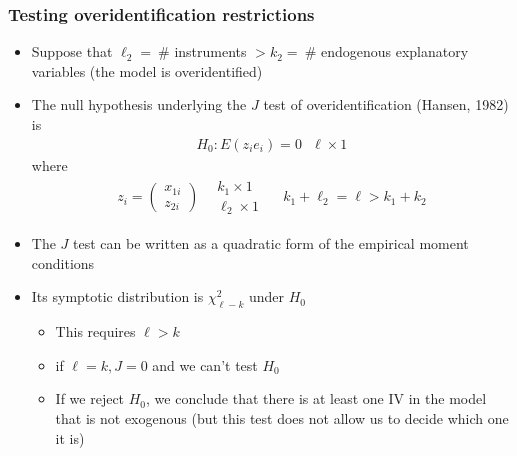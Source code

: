 \documentclass[a4paper,twoside,11pt]{article}
\begin{document}
\subsubsection{Testing overidentification restrictions}
\begin{itemize}
    \item Suppose that $\ell_2 = \ \#$ instruments $> k_2 = \ \# $ endogenous explanatory variables (the model is overidentified)
    \item The null hypothesis underlying the $J$ test of overidentification (Hansen, 1982) is 
\newline
\begin{equation*}
\begin{aligned}
H_0 : E(z_i e_i)=0 \ \ \ \ell \times 1
\end{aligned} 
\end{equation*}
where
\begin{equation*}
\begin{aligned}
z_i = \begin{pmatrix}
x_{1i} \\
z_{2i}
\end{pmatrix} \ \ \ \ \begin{matrix}
k_1 \times 1 \\
\ell_2 \times 1
\end{matrix} \ \ \ \ \ \ k_1 + \ell_2 = \ell > k_1 + k_2
\end{aligned} 
\end{equation*}
    \item The $J$ test can be written as a quadratic form of the empirical moment conditions
    \item Its symptotic distribution is $\chi^2_{\ell -k}$ under $H_0$
    \begin{itemize}
        \item This requires $\ell >k$
        \item if $\ell =k, J=0$ and we can't test $H_0$
        \item If we reject $H_0$, we conclude that there is at least one IV in the model that is not exogenous (but this test does not allow us to decide which one it is)
    \end{itemize}
\end{itemize}
\end{document}
